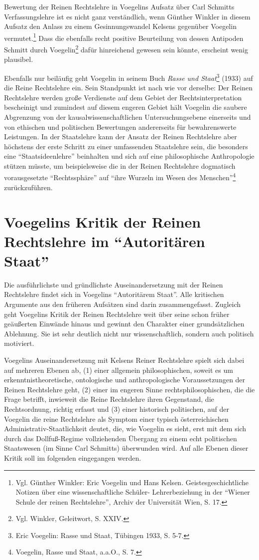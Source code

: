 \documentclass[12pt,a4paper,ngerman]{article}
\begin{document}
Bewertung der Reinen Rechtslehre in Voegelins Aufsatz über Carl Schmitts
Verfassungslehre ist es nicht ganz verständlich, wenn Günther Winkler in
diesem Aufsatz den Anlass zu einem Gesinnungswandel Kelsens gegenüber Voegelin
vermutet.\footnote{Vgl. Günther Winkler: Eric Voegelin und Hans Kelsen.
  Geistesgeschichtliche Notizen über eine wissenschaftliche Schüler-
  Lehrerbeziehung in der "`Wiener Schule der reinen Rechtslehre"', Archiv der
  Universität Wien, S. 17.} Dass die ebenfalls recht positive Beurteilung von
dessen Antipoden Schmitt durch Voegelin\footnote{Vgl. Winkler, Geleitwort, S.
  XXIV.} dafür hinreichend gewesen sein könnte, erscheint wenig plausibel.

Ebenfalls nur beiläufig geht Voegelin in seinem Buch {\em Rasse und
  Staat}\footnote{Eric Voegelin: Rasse und Staat, Tübingen 1933, S.
  5-7.}  (1933) auf die Reine Rechtslehre ein. Sein Standpunkt ist
nach wie vor derselbe: Der Reinen Rechtslehre werden große Verdienste
auf dem Gebiet der Rechtsinterpretation bescheinigt und zumindest auf
diesem engeren Gebiet hält Voegelin die saubere Abgrenzung von der
kausalwissenschaftlichen Untersuchungsebene einerseits und von
ethischen und politischen Bewertungen andererseits für bewahrenswerte
Leistungen. In der Staatslehre kann der Ansatz der Reinen Rechtslehre
aber höchstens der erste Schritt zu einer umfassenden Staatslehre
sein, die besonders eine "`Staatsideenlehre"' beinhalten und sich auf
eine philosophische Anthropologie stützen müsste, um beispielsweise
die in der Reinen Rechtslehre dogmatisch vorausgesetzte
"`Rechtssphäre"' auf "`ihre Wurzeln im Wesen des
Menschen"'\footnote{Voegelin, Rasse und Staat, a.a.O., S. 7.}
zurückzuführen.

\section{Voegelins Kritik der Reinen Rechtslehre im "`Autoritären Staat"'}

Die ausführlichste und gründlichste Auseinandersetzung mit der Reinen
Rechtslehre findet sich in Voegelins "`Autoritärem Staat"'. Alle kritischen
Argumente aus den früheren Aufsätzen sind darin zusammengefasst.  Zugleich
geht Voegelins Kritik der Reinen Rechtslehre weit über seine schon früher
geäußerten Einwände hinaus und gewinnt den Charakter einer grundsätzlichen
Ablehnung. Sie ist sehr deutlich nicht nur wissenschaftlich, sondern auch
politisch motiviert.

Voegelins Auseinandersetzung mit Kelsens Reiner Rechtslehre spielt sich dabei
auf mehreren Ebenen ab, (1) einer allgemein philosophischen, soweit es um
erkenntnistheoretische, ontologische und anthropologische Voraussetzungen der
Reinen Rechtslehre geht, (2) einer im engeren Sinne rechtsphilosophischen, die
die Frage betrifft, inwieweit die Reine Rechtslehre ihren Gegenstand, die
Rechtsordnung, richtig erfasst und (3) einer historisch politischen, auf der
Voegelin die reine Rechtslehre als Symptom einer typisch österreichischen
Administrativ-Staatlichkeit deutet, die, wie Voegelin es sieht, erst mit dem
sich durch das Dollfuß-Regime vollziehenden Übergang zu einem echt
politischen Staatswesen (im Sinne Carl Schmitts) überwunden wird. Auf alle
Ebenen dieser Kritik soll im folgenden eingegangen werden.
\end{document}

